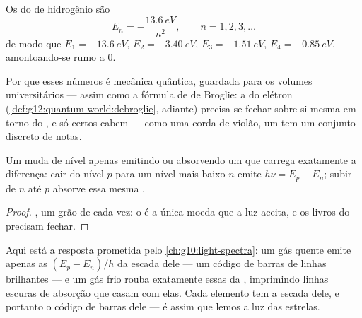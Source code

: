 \begin{proposition}\label{prop:g12:quantum-world:hydrogen}
Os  do  de hidrogênio são
\[
E_n = -\frac{\qty{13.6}{eV}}{n^2}, \qquad n = 1, 2, 3, \dots
\]
de modo que $E_1 = \qty{-13.6}{eV}$, $E_2 = \qty{-3.40}{eV}$,
$E_3 = \qty{-1.51}{eV}$, $E_4 = \qty{-0.85}{eV}$, amontoando-se rumo a $0$.
\end{proposition}
\admitted

\begin{remark}\label{rem:g12:quantum-world:ladder-origin}
Por que esses números é mecânica quântica, guardada para os volumes universitários ---
assim como a fórmula de de Broglie: a  do elétron
(\cref{def:g12:quantum-world:debroglie}, adiante) precisa se fechar sobre si mesma em
torno do , e só certos  cabem --- como uma corda de violão, um
 tem um conjunto discreto de notas.
\end{remark}

\begin{theorem}\label{thm:g12:quantum-world:transition}
Um  muda de nível apenas emitindo ou absorvendo um  que carrega exatamente a
diferença: cair do nível $p$ para um nível mais baixo $n$ emite $h\nu = E_p - E_n$;
subir de $n$ até $p$ absorve essa mesma .
\end{theorem}

\begin{proof}
, um grão de cada vez: o  é a única moeda que a luz aceita, e
os livros do  precisam fechar.
\end{proof}

\begin{remark}\label{rem:g12:quantum-world:lines}
Aqui está a resposta prometida pelo \cref{ch:g10:light-spectra}: um gás quente emite
apenas as  $(E_p - E_n)/h$ da escada dele --- um código de barras de linhas
brilhantes --- e um gás frio rouba exatamente essas  da ,
imprimindo linhas escuras de absorção que casam com elas. Cada elemento tem a escada
dele, e portanto o código de barras dele --- é assim que lemos a luz das estrelas.
\end{remark}


